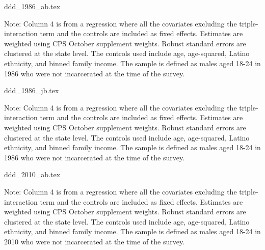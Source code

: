\documentclass{article}
\begin{document}
  {ddd_1986_ab.tex}
\begin{footnotesize}
  \noindent Note: Column 4 is from a regression where all the covariates excluding the triple-interaction term and the controls are included as fixed effects. Estimates are weighted using CPS October supplement weights. Robust standard errors are clustered at the state level. The controls used include age, age-squared, Latino ethnicity, and binned family income. The sample is defined as males aged 18-24 in 1986 who were not incarcerated at the time of the survey. 
\end{footnotesize}
\clearpage

{ddd_1986_jb.tex}
\begin{footnotesize}
  \noindent Note: Column 4 is from a regression where all the covariates excluding the triple-interaction term and the controls are included as fixed effects. Estimates are weighted using CPS October supplement weights. Robust standard errors are clustered at the state level. The controls used include age, age-squared, Latino ethnicity, and binned family income. The sample is defined as males aged 18-24 in 1986 who were not incarcerated at the time of the survey. 
\end{footnotesize}

\clearpage

{ddd_2010_ab.tex}
\begin{footnotesize}
  \noindent Note: Column 4 is from a regression where all the covariates excluding the triple-interaction term and the controls are included as fixed effects. Estimates are weighted using CPS October supplement weights. Robust standard errors are clustered at the state level. The controls used include age, age-squared, Latino ethnicity, and binned family income. The sample is defined as males aged 18-24 in 2010 who were not incarcerated at the time of the survey. 
\end{footnotesize}

\clearpage
\end{document}
